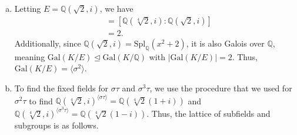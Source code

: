\documentclass[10pt]{extarticle}
\newcommand{\Q}{\mathbb{Q}}
\begin{document}
\begin{enumerate}[(a)]
    \item Letting $E = \Q(\sqrt{2},i)$, we have
      \begin{align*}
        [K:E] &= [\Q(\sqrt[4]{2},i):\Q(\sqrt{2},i)]\\
              &= 2.
      \end{align*}
      Additionally, since $\Q(\sqrt{2},i) = \text{Spl}_{\Q}(x^2 + 2)$, it is also Galois over $\Q$, meaning $\text{Gal}(K/E)\trianglelefteq \text{Gal}(K/\Q)$ with $|\text{Gal}(K/E)| = 2$. Thus, $\text{Gal}(K/E) = \langle \sigma^2\rangle$.
    \item To find the fixed fields for $\sigma\tau$ and $\sigma^3\tau$, we use the procedure that we used for $\sigma^2\tau$ to find $\Q(\sqrt[4]{2},i)^{\langle \sigma\tau\rangle} = \Q\left(\sqrt[4]{2}(1+i)\right)$ and $\Q(\sqrt[4]{2},i)^{\langle \sigma^3\tau\rangle} = \Q\left(\sqrt[4]{2}(1-i)\right)$. Thus, the lattice of subfields and subgroups is as follows.
      \begin{center}

\end{center}
\end{enumerate}
\end{document}
